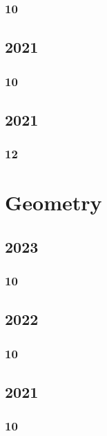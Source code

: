 \documentclass[11pt]{book}
\begin{document}
\subsection{10}

\section{2021}
\subsection{10}



\section{2021}
\subsection{12}


\chapter{Geometry}
\section{2023}
\subsection{10}


\section{2022}
\subsection{10}


\section{2021}
\subsection{10}


%
%
%
\end{document}

